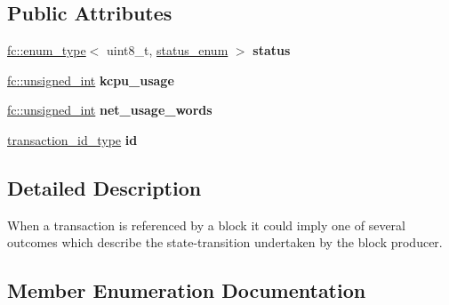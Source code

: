 \subsection*{Public Attributes}
\begin{DoxyCompactItemize}
\item 
\mbox{\label{structaacio_1_1chain_1_1transaction__receipt_a12288834209a87ba6eeb4d41c09c4a41}} 
\mbox{\hyperlink{classfc_1_1enum__type}{fc\+::enum\+\_\+type}}$<$ uint8\+\_\+t, \mbox{\hyperlink{structaacio_1_1chain_1_1transaction__receipt_aa2bcda79342889b1b3de6f5819e27e11}{status\+\_\+enum}} $>$ {\bfseries status}
\item 
\mbox{\label{structaacio_1_1chain_1_1transaction__receipt_adf6c867be7332e91bfbf7b3d355893cb}} 
\mbox{\hyperlink{structfc_1_1unsigned__int}{fc\+::unsigned\+\_\+int}} {\bfseries kcpu\+\_\+usage}
\item 
\mbox{\label{structaacio_1_1chain_1_1transaction__receipt_a7f0075bc570922c6133f6b8a64e97d15}} 
\mbox{\hyperlink{structfc_1_1unsigned__int}{fc\+::unsigned\+\_\+int}} {\bfseries net\+\_\+usage\+\_\+words}
\item 
\mbox{\label{structaacio_1_1chain_1_1transaction__receipt_a197ed7d2e2efd644beaa175999f81be9}} 
\mbox{\hyperlink{classfc_1_1sha256}{transaction\+\_\+id\+\_\+type}} {\bfseries id}
\end{DoxyCompactItemize}


\subsection{Detailed Description}
When a transaction is referenced by a block it could imply one of several outcomes which describe the state-\/transition undertaken by the block producer. 

\subsection{Member Enumeration Documentation}
\mbox{\label{structaacio_1_1chain_1_1transaction__receipt_aa2bcda79342889b1b3de6f5819e27e11}} 
